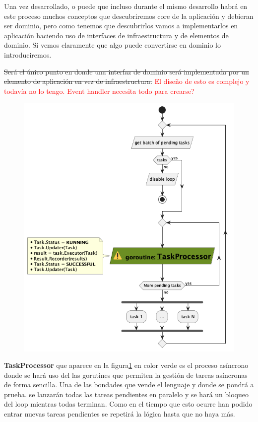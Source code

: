 Una vez desarrollado, o puede que incluso durante el mismo desarrollo habrá en este proceso muchos conceptos que descubriremos core de la aplicación y debieran ser dominio, pero como tenemos que descubrirlos vamos a implementarlos en aplicación haciendo uso de interfaces de infraestructura y de elementos de dominio. Si vemos claramente que algo puede convertirse en dominio lo introduciremos.

\sout{Será el único punto en donde una interfaz de dominio será implementada por un elemento de aplicación en vez de infraestructura.} \textcolor{red}{El diseño de esto es complejo y todavía no lo tengo. Event handler necesita todo para crearse?}

\begin{figure}[H]
    \centering
    \includegraphics[height=0.3\textheight]{./part/Proyecto_ejecutivo/memoria_descriptiva/descripcionDelProyecto/manager/uml/executeTaskLoop}
    \caption[Diagrama de objetos de dominio]{}\label{fig:executeTaskLoop}
\end{figure}

\textbf{TaskProcessor} que aparece en la figura\ref{fig:executeTaskLoop} en color verde es el proceso asíncrono donde se hará uso del las gorutines que permiten la gestión de tareas asíncronas de forma sencilla. Una de las bondades que vende el lenguaje y donde se pondrá a prueba. se lanzarán todas las tareas pendientes en paralelo y se hará un bloqueo del loop mientras todas terminan. Como en el tiempo que esto ocurre han podido entrar nuevas tareas pendientes se repetirá la lógica hasta que no haya más.

